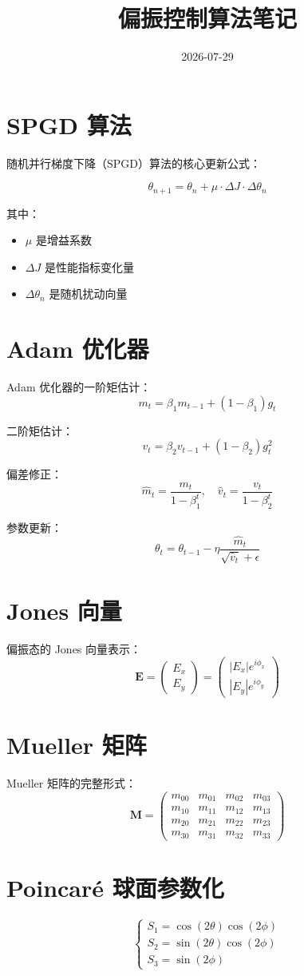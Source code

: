 \documentclass{article}
\title{偏振控制算法笔记}
\date{2026-07-29}
\begin{document}
\maketitle

\section{SPGD 算法}

随机并行梯度下降（SPGD）算法的核心更新公式：

\[
\theta_{n+1} = \theta_n + \mu \cdot \Delta J \cdot \Delta\theta_n
\]

其中：
\begin{itemize}
\item $\mu$ 是增益系数
\item $\Delta J$ 是性能指标变化量
\item $\Delta\theta_n$ 是随机扰动向量
\end{itemize}

\section{Adam 优化器}

Adam 优化器的一阶矩估计：
\[
m_t = \beta_1 m_{t-1} + (1-\beta_1) g_t
\]

二阶矩估计：
\[
v_t = \beta_2 v_{t-1} + (1-\beta_2) g_t^2
\]

偏差修正：
\[
\hat{m}_t = \frac{m_t}{1-\beta_1^t}, \quad \hat{v}_t = \frac{v_t}{1-\beta_2^t}
\]

参数更新：
\[
\theta_t = \theta_{t-1} - \eta \frac{\hat{m}_t}{\sqrt{\hat{v}_t} + \epsilon}
\]

\section{Jones 向量}

偏振态的 Jones 向量表示：
\[
\mathbf{E} = \begin{pmatrix} E_x \\ E_y \end{pmatrix} = \begin{pmatrix} |E_x| e^{i\phi_x} \\ |E_y| e^{i\phi_y} \end{pmatrix}
\]

\section{Mueller 矩阵}

Mueller 矩阵的完整形式：
\[
\mathbf{M} = \begin{pmatrix} 
m_{00} & m_{01} & m_{02} & m_{03} \\ 
m_{10} & m_{11} & m_{12} & m_{13} \\ 
m_{20} & m_{21} & m_{22} & m_{23} \\ 
m_{30} & m_{31} & m_{32} & m_{33} 
\end{pmatrix}
\]

\section{Poincaré 球面参数化}

\[
\begin{cases}
S_1 = \cos(2\theta)\cos(2\phi) \\
S_2 = \sin(2\theta)\cos(2\phi) \\
S_3 = \sin(2\phi)
\end{cases}
\]
\end{document}

